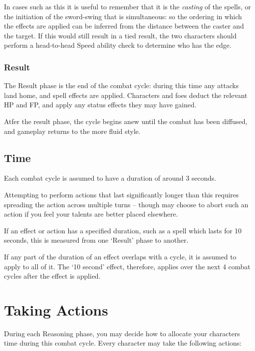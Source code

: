 In cases such as this it is useful to remember that it is the {\it casting} of the spells, or the initiation of the sword-swing that is simultaneous: so the ordering in which the effects are applied can be inferred from the distance between the caster and the target. If this would still result in a tied result, the two characters should perform a head-to-head Speed ability check to determine who has the edge. 
 

\subsubsection{Result}

The Result phase is the end of the combat cycle: during this time any attacks land home, and spell effects are applied. Characters and foes deduct the relevant HP and FP, and apply any status effects they may have gained. 
 
 Atfer the result phase, the cycle begins anew until the combat has been diffused, and gameplay returns to the more fluid style. 


\subsection{Time}

Each combat cycle is assumed to have a duration of around 3 seconds. 

Attempting to perform actions that last significantly longer than this requires spreading the action across multiple turns -- though may choose to abort such an action if you feel your talents are better placed elsewhere. 

If an effect or action has a specified duration, such as a spell which lasts for 10 seconds, this is measured from one `Result' phase to another. 

If any part of the duration of an effect overlaps with a cycle, it is assumed to apply to all of it. The `10 second' effect, therefore, applies over the next 4 combat cycles after the effect is applied. 

\newpage

 \section{Taking Actions} \label{S:CombatActions}
 
 During each Reasoning phase, you may decide how to allocate your character\apos{}s time during this combat cycle. Every character may take the following actions: 
 
